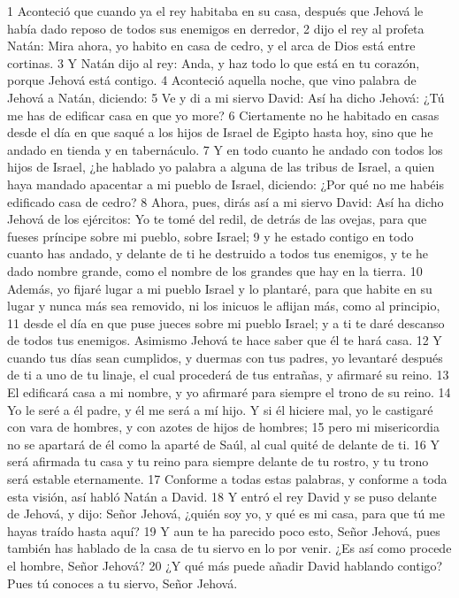 1 Aconteció que cuando ya el rey habitaba en su casa, después que Jehová le había dado reposo de todos sus enemigos en derredor,
2 dijo el rey al profeta Natán: Mira ahora, yo habito en casa de cedro, y el arca de Dios está entre cortinas.
3 Y Natán dijo al rey: Anda, y haz todo lo que está en tu corazón, porque Jehová está contigo.
4 Aconteció aquella noche, que vino palabra de Jehová a Natán, diciendo:
5 Ve y di a mi siervo David: Así ha dicho Jehová: ¿Tú me has de edificar casa en que yo more?
6 Ciertamente no he habitado en casas desde el día en que saqué a los hijos de Israel de Egipto hasta hoy, sino que he andado en tienda y en tabernáculo.
7 Y en todo cuanto he andado con todos los hijos de Israel, ¿he hablado yo palabra a alguna de las tribus de Israel, a quien haya mandado apacentar a mi pueblo de Israel, diciendo: ¿Por qué no me habéis edificado casa de cedro?
8 Ahora, pues, dirás así a mi siervo David: Así ha dicho Jehová de los ejércitos: Yo te tomé del redil, de detrás de las ovejas, para que fueses príncipe sobre mi pueblo, sobre Israel;
9 y he estado contigo en todo cuanto has andado, y delante de ti he destruido a todos tus enemigos, y te he dado nombre grande, como el nombre de los grandes que hay en la tierra.
10 Además, yo fijaré lugar a mi pueblo Israel y lo plantaré, para que habite en su lugar y nunca más sea removido, ni los inicuos le aflijan más, como al principio,
11 desde el día en que puse jueces sobre mi pueblo Israel; y a ti te daré descanso de todos tus enemigos. Asimismo Jehová te hace saber que él te hará casa.
12 Y cuando tus días sean cumplidos, y duermas con tus padres, yo levantaré después de ti a uno de tu linaje, el cual procederá de tus entrañas, y afirmaré su reino.
13 El edificará casa a mi nombre, y yo afirmaré para siempre el trono de su reino.
14 Yo le seré a él padre, y él me será a mí hijo. Y si él hiciere mal, yo le castigaré con vara de hombres, y con azotes de hijos de hombres;
15 pero mi misericordia no se apartará de él como la aparté de Saúl, al cual quité de delante de ti.
16 Y será afirmada tu casa y tu reino para siempre delante de tu rostro, y tu trono será estable eternamente.
17 Conforme a todas estas palabras, y conforme a toda esta visión, así habló Natán a David.
18 Y entró el rey David y se puso delante de Jehová, y dijo: Señor Jehová, ¿quién soy yo, y qué es mi casa, para que tú me hayas traído hasta aquí?
19 Y aun te ha parecido poco esto, Señor Jehová, pues también has hablado de la casa de tu siervo en lo por venir. ¿Es así como procede el hombre, Señor Jehová?
20 ¿Y qué más puede añadir David hablando contigo? Pues tú conoces a tu siervo, Señor Jehová.
